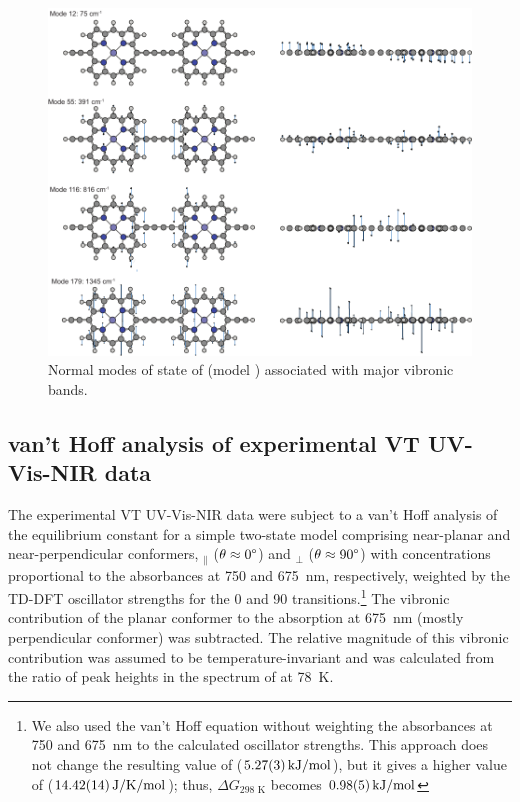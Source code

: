 		\begin{figure}[ht!]
			\centering\includegraphics{figures/dimer/si-vibrations-s3.pdf} 
			\caption[]{Normal modes of  state of  (model ) associated with major vibronic bands.}
			\label{fig:dimer:s3}
		\end{figure}
		\FloatBarrier
	\subsection{van't Hoff analysis of experimental VT UV-Vis-NIR data}

		The experimental VT UV-Vis-NIR data were subject to a van't Hoff analysis of the equilibrium constant for a simple two-state model comprising near-planar and near-perpendicular conformers, $_\parallel$ ($\theta \approx 0\degree$) and $_\bot$ ($\theta \approx 90\degree$) with concentrations proportional to the absorbances at 750 and \SI{675}{\nano\metre}, respectively, weighted by the TD-DFT oscillator strengths for the 0\textdegree{} and 90\textdegree{} transitions.\footnote[3]{We also used the van't Hoff equation without weighting the absorbances at 750 and \SI{675}{\nano\metre} to the calculated oscillator strengths.  This approach does not change the resulting value of \delh{} ($\SI{5.27 \pm 0.03}{\kjmol}$), but it gives a higher value of \dels{} ($\SI{14.42 \pm 0.14}{\jkmol}$); thus, $\Delta{}G_{\text{298 K}}$ becomes $\SI{0.98 \pm 0.05}{\kjmol}$ } The vibronic contribution of the planar conformer to the absorption at \SI{675}{\nano\metre} (mostly perpendicular conformer) was subtracted. The relative magnitude of this vibronic contribution was assumed to be temperature-invariant and was calculated from the ratio of peak heights in the spectrum of  at \SI{78}{\kelvin}. 

